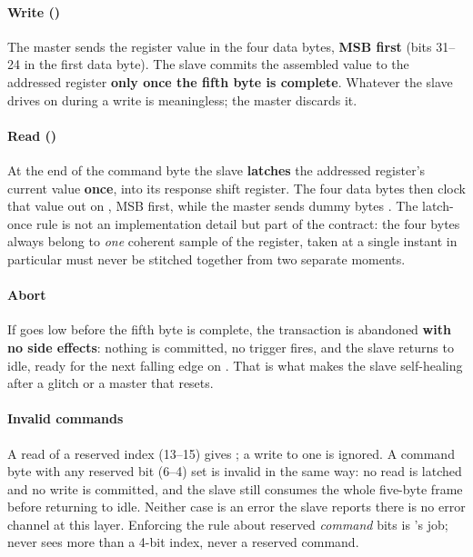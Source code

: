 \paragraph{Write ()}
The master sends the register value in the four data bytes, \textbf{MSB first} (bits 31--24 in the
first data byte). The slave commits the assembled value to the addressed register \textbf{only once
the fifth byte is complete}. Whatever the slave drives on  during a write is meaningless;
the master discards it.

\paragraph{Read ()}
At the end of the command byte the slave \textbf{latches} the addressed register's current value
\textbf{once}, into its response shift register. The four data bytes then clock that value out on
, MSB first, while the master sends dummy bytes . The latch-once rule is not an
implementation detail but part of the contract: the four bytes always belong to \emph{one} coherent
sample of the register, taken at a single instant \textemdash{}  in particular must never
be stitched together from two separate moments.

\paragraph{Abort}
If  goes low before the fifth byte is complete, the transaction is abandoned
\textbf{with no side effects}: nothing is committed, no trigger fires, and the slave returns to idle,
ready for the next falling edge on . That is what makes the slave self-healing after a glitch
or a master that resets.

\paragraph{Invalid commands}
A read of a reserved index (13--15) gives ; a write to one is ignored. A command byte
with any reserved bit (6--4) set is invalid in the same way: no read is latched and no write is
committed, and the slave still consumes the whole five-byte frame before returning to idle. Neither
case is an error the slave reports \textemdash{} there is no error channel at this layer. Enforcing
the rule about reserved \emph{command} bits is 's job;  never
sees more than a 4-bit index, never a reserved command.

